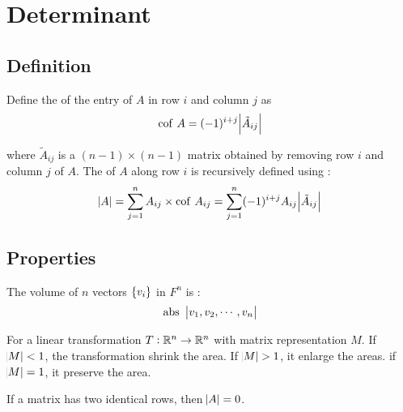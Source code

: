 \chapter{Determinant}


\section{Definition}

\begin{definition}[determinate]
    Define the  of the entry of $A$ in row $i$ and column $j$ as
    \begin{equation}
        \displaystyle \mathrm{cof}~\displaystyle A = (-1)^{i+j}\abs{\tilde{A}_{ij}}
    \end{equation}
    
    where $\tilde{A}_{ij}$ is a $(n-1)\times (n-1)$ matrix obtained by removing row $i$ and column $j$ of $A$. The  of $A$ along row $i$ is recursively defined using :
    \begin{equation}
    \abs{A} = \sum_{j=1}^n A_{ij} \times \displaystyle \mathrm{cof}~\displaystyle A_{ij} = \sum_{j=1}^n (-1)^{i+j} A_{ij}  \abs{\tilde{A}_{ij}}
    \end{equation}
\end{definition}




\section{Properties}

\begin{theorem}
    The volume of $n$ vectors $\set{v_i}$ in $F^n$ is :
    \begin{equation}
      \mathrm{abs}~\begin{vmatrix}
            v_1, v_2, \cdots,  v_n
        \end{vmatrix}
    \end{equation}
\end{theorem}

\begin{theorem}
    For a linear transformation $T: \mathbb{R}^n \rightarrow \mathbb{R}^n$ with matrix representation $M$. If $\abs{M} < 1$, the transformation shrink the area. If $\abs{M} > 1$, it enlarge the areas. if $\abs{M} = 1$, it preserve the area.
\end{theorem}


\begin{theorem}
    If a matrix has two identical rows, then $\abs{A} = 0$.
\end{theorem}


